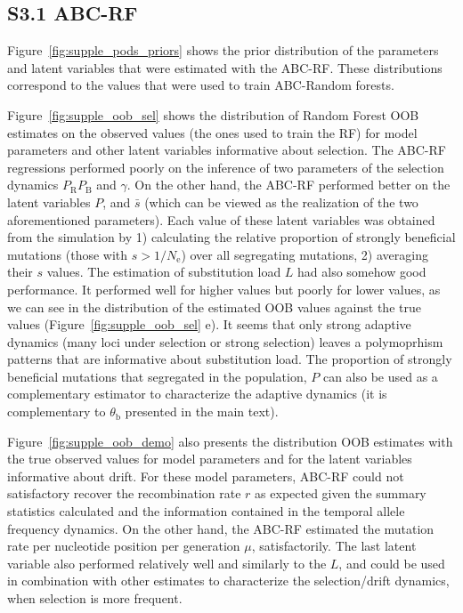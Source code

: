 \documentclass[a4paper, 12pt]{article}
\begin{document}
\subsection*{S3.1 ABC-RF}

Figure~\ref{fig:supple_pods_priors} shows the prior distribution of the parameters and latent variables that were estimated with the ABC-RF. These distributions correspond to the values that were used to train ABC-Random forests. 

Figure~\ref{fig:supple_oob_sel} shows the distribution of Random Forest OOB estimates on the observed values (the ones used to train the RF) for model parameters and other latent variables informative about selection. The ABC-RF regressions performed poorly on the inference of two parameters of the selection dynamics $P_{\mathrm{R}}P_{\mathrm{B}}$ and $\gamma$. On the other hand, the ABC-RF performed better on the latent variables $P$, and $\bar{s}$ (which can be viewed as the realization of the two aforementioned parameters). Each value of these latent variables was obtained from the simulation by 1) calculating the relative proportion of strongly beneficial mutations (those with $s > 1/N_{\mathrm{e}}$) over all segregating mutations, 2) averaging their $s$ values. 
The estimation of substitution load $L$ had also somehow good performance. It performed well for higher values but poorly for lower values, as we can see in the distribution of the estimated OOB values against the true values (Figure~\ref{fig:supple_oob_sel} e). It seems that only strong adaptive dynamics (many loci under selection or strong selection) leaves a polymoprhism patterns that are informative about substitution load. The proportion of strongly beneficial mutations that segregated in the population, $P$ can also be used as a complementary estimator to characterize the adaptive dynamics (it is complementary to $\theta_{\mathrm{b}}$ presented in the main text). 

Figure~\ref{fig:supple_oob_demo} also presents the distribution OOB estimates with the true observed values for model parameters and for the latent variables informative about drift. For these model parameters, ABC-RF could not satisfactory recover the recombination rate $r$ as expected given the summary statistics calculated and the information contained in the temporal allele frequency dynamics. On the other hand, the ABC-RF estimated the mutation rate per nucleotide position per generation $\mu$, satisfactorily. The last latent variable also performed relatively well and similarly to the $L$, and could be used in combination with other estimates to characterize the selection/drift dynamics, when selection is more frequent. 
\end{document}
